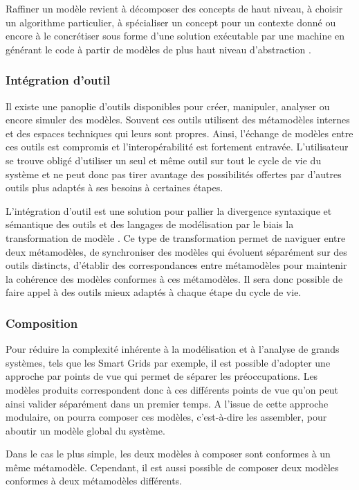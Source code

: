 Raffiner un modèle revient à décomposer des concepts de haut niveau, à choisir 
un algorithme particulier, à spécialiser un concept pour un contexte donné ou 
encore à le concrétiser sous forme d'une solution exécutable par une machine en 
générant le code à partir de modèles de plus haut niveau d'abstraction 
\cite{czarnecki2000intentional}. 

\subsubsection{Intégration d'outil}

Il existe une panoplie d'outils disponibles pour créer, manipuler, analyser ou 
encore simuler des modèles. Souvent ces outils utilisent des métamodèles 
internes et des espaces techniques qui leurs sont propres. Ainsi, l'échange de 
modèles entre ces outils est compromis et l'interopérabilité est fortement 
entravée. L'utilisateur se trouve obligé d'utiliser un seul et même outil sur 
tout le cycle de vie du système et ne peut donc pas tirer avantage des 
possibilités offertes par d'autres outils plus adaptés à ses besoins à certaines 
étapes.

L'intégration d'outil est une solution pour pallier la divergence syntaxique et 
sémantique des outils et des langages de modélisation par le biais la 
transformation de modèle \cite{tratt2005model}. Ce type de transformation permet 
de naviguer entre deux métamodèles, de synchroniser des modèles qui évoluent 
séparément sur des outils distincts, d'établir des correspondances entre métamodèles pour 
maintenir la cohérence des modèles conformes à ces métamodèles. Il sera donc 
possible de faire appel à des outils mieux adaptés à chaque étape du cycle de 
vie.

\subsubsection{Composition}

Pour réduire la complexité inhérente à la modélisation et à l'analyse de grands 
systèmes, tels que les Smart Grids par exemple, il est possible d'adopter une 
approche par points de vue qui permet de séparer les préoccupations. Les modèles 
produits correspondent donc à ces différents points de vue qu'on peut ainsi 
valider séparément dans un premier temps. A l'issue de cette approche modulaire, 
on pourra composer ces modèles, c'est-à-dire les assembler, pour aboutir un 
modèle global du système.

Dans le cas le plus simple, les deux modèles à composer sont conformes à un même 
métamodèle. Cependant, il est aussi possible de composer deux modèles conformes 
à deux métamodèles différents. 

